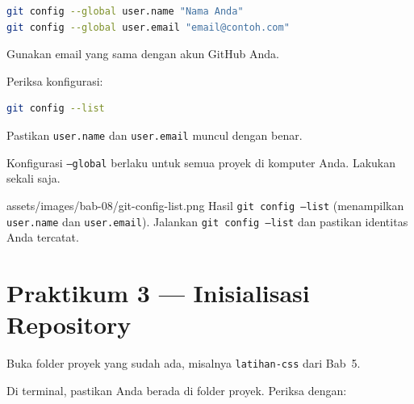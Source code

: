 \begin{lstlisting}[language=bash, caption={Konfigurasi identitas Git}, label={lst:git-config}]
git config --global user.name "Nama Anda"
git config --global user.email "email@contoh.com"
\end{lstlisting}

\begin{langkah}
  \item Gunakan email yang sama dengan akun GitHub Anda.
  \item Periksa konfigurasi:
\end{langkah}

\begin{lstlisting}[language=bash, caption={Memeriksa konfigurasi}, label={lst:git-config-list}]
git config --list
\end{lstlisting}

\begin{langkah}
  \item Pastikan \texttt{user.name} dan \texttt{user.email} muncul dengan benar.
\end{langkah}

\begin{tip}
Konfigurasi \texttt{--global} berlaku untuk semua proyek di komputer Anda. Lakukan sekali saja.
\end{tip}

\begin{tangkapanlayar}
  {assets/images/bab-08/git-config-list.png}
  {Hasil \texttt{git config --list} (menampilkan \texttt{user.name} dan \texttt{user.email}).}
  {Jalankan \texttt{git config --list} dan pastikan identitas Anda tercatat.}
\end{tangkapanlayar}

\section{Praktikum 3 --- Inisialisasi Repository}
\label{sec:git-praktik-3}

\begin{langkah}
  \item Buka folder proyek yang sudah ada, misalnya \texttt{latihan-css} dari Bab~5.
  \item Di terminal, pastikan Anda berada di folder proyek. Periksa dengan:
\end{langkah}

